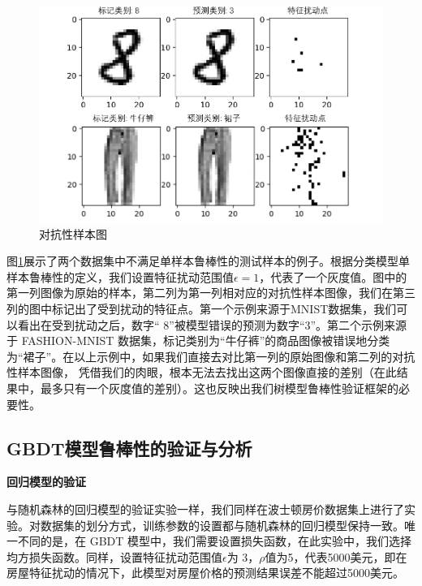 \begin{figure}[!hbt]
\centering
	\includegraphics[scale=0.7]{fig2/C5/adversarial_example.pdf}
	\caption{对抗性样本图}
	\label{fig:adversarial_example}	
\end{figure}

图\ref{fig:adversarial_example}展示了两个数据集中不满足单样本鲁棒性的测试样本的例子。根据分类模型单样本鲁棒性的定义，我们设置特征扰动范围值$\epsilon=1$，代表了一个灰度值。图中的第一列图像为原始的样本，第二列为第一列相对应的对抗性样本图像，我们在第三列的图中标记出了受到扰动的特征点。第一个示例来源于MNIST数据集，我们可以看出在受到扰动之后，数字“ 8”被模型错误的预测为数字“3”。第二个示例来源于 FASHION-MNIST 数据集，标记类别为“牛仔裤”的商品图像被错误地分类为“裙子”。在以上示例中，如果我们直接去对比第一列的原始图像和第二列的对抗性样本图像， 凭借我们的肉眼，根本无法去找出这两个图像直接的差别（在此结果中，最多只有一个灰度值的差别）。这也反映出我们树模型鲁棒性验证框架的必要性。

\subsection{GBDT模型鲁棒性的验证与分析}
\textbf{回归模型的验证}

与随机森林的回归模型的验证实验一样，我们同样在波士顿房价数据集上进行了实验。对数据集的划分方式，训练参数的设置都与随机森林的回归模型保持一致。唯一不同的是，在 GBDT 模型中，我们需要设置损失函数，在此实验中，我们选择均方损失函数。同样，设置特征扰动范围值$\epsilon$为 3，$\rho$值为5，代表5000美元，即在房屋特征扰动的情况下，此模型对房屋价格的预测结果误差不能超过5000美元。


